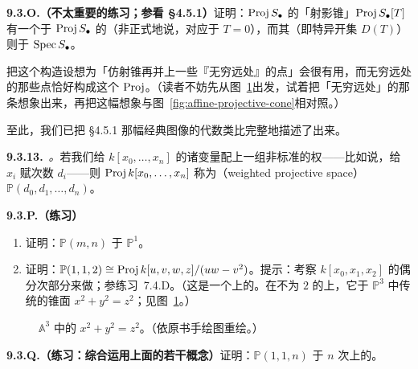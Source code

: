 \textbf{9.3.O.（不太重要的练习；参看 \S4.5.1）}\quad 证明：$\operatorname{Proj} S_\bullet$ 的「射影锥」$\operatorname{Proj} S_\bullet[T]$ 有一个\trIsomorphic{}于 $\operatorname{Proj} S_\bullet$ 的\trClosedSubscheme（非正式地说，对应于 $T=0$），而其\trComplement{}（即特异开集 $D(T)$）则\trIsomorphic{}于\trAffine\trCone{} $\operatorname{Spec} S_\bullet$。

把这个构造设想为「仿射锥再并上一些『无穷远处』的点」会很有用，而无穷远处的那些点恰好构成这个 $\operatorname{Proj}$。（读者不妨先从图~\ref{fig:traditional-cone}出发，试着把「无穷远处」的那条\trConic{}想象出来，再把这幅想象与图~\ref{fig:affine-projective-cone}相对照。）

至此，我们已把 \S4.5.1 那幅经典图像的代数类比完整地描述了出来。

\textbf{9.3.13.}\ \emph{\trhDefinition{}。}\quad 若我们给 $k[x_0,\dots,x_n]$ 的诸变量配上一组非标准的权——比如说，给 $x_i$ 赋次数 $d_i$——则 $\operatorname{Proj} k[x_0,\dots,x_n]$ 称为\textbf{\trWeightedProjectiveSpace{}}（weighted projective space）$\mathbb{P}(d_0,d_1,\dots,d_n)$。

\textbf{9.3.P.（练习）}\quad
\begin{enumerate}[label=(\alph*)]
  \item 证明：$\mathbb{P}(m,n)$ \trIsomorphic{}于 $\mathbb{P}^1$。
  \item 证明：$\mathbb{P}(1,1,2)\cong\operatorname{Proj} k[u,v,w,z]/(uw-v^2)$。提示：考察 $k[x_0,x_1,x_2]$ 的偶分次部分来做；参\mbox{练习~7.4.D}。（这是一个\trConic{}上的\trProjective\trCone。在\trCharacteristic{}不为 $2$ 的\trField{}上，它\trIsomorphic{}于 $\mathbb{P}^3$ 中传统的锥面 $x^2+y^2=z^2$；见图~\ref{fig:traditional-cone}。）
\end{enumerate}

\begin{figure}[htbp]
\centering
{}
\caption{$\mathbb{A}^3$ 中的\trCone{} $x^2+y^2=z^2$。（依原书手绘图重绘。）}\label{fig:traditional-cone}
\end{figure}

\textbf{9.3.Q.（练习：综合运用上面的若干概念）}\quad 证明：$\mathbb{P}(1,1,n)$ \trIsomorphic{}于 $n$ 次\trRationalNormalCurve{}上的\trProjective\trCone。
